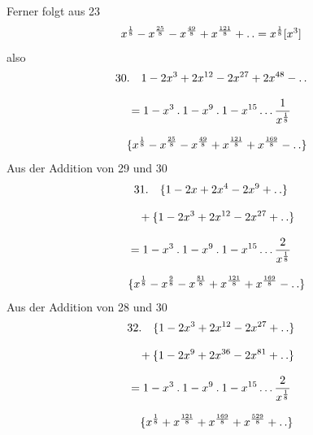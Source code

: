 Ferner folgt aus 23
\[
x^{\frac18}-x^{\frac{25}{8}}-x^{\frac{49}{8}}+x^{\frac{121}{8}}+\mathinner{.\,.}
 =x^{\frac18}[x^{3}]
\]
also
\[
\begin{gathered}
30.\quad 1-2x^{3}+2x^{12}-2x^{27}+2x^{48}-\mathinner{.\,.}\\[8pt]
 =1-x^{3}\mathbin{.}1-x^{9}\mathbin{.}1-x^{15}\mathinner{.\,.\,.}\frac{1}{x^{\frac18}}
 \\[8pt]\quad{}\{x^{\frac18}-x^{\frac{25}{8}}-x^{\frac{49}{8}}+x^{\frac{121}{8}}+x^{\frac{169}{8}}-\mathinner{.\,.}\}
\end{gathered}
\]
Aus der Addition von 29 und 30
\[
\begin{gathered}
31.\quad \{1-2x+2x^{4}-2x^{9}+\mathinner{.\,.}\}\\[8pt]\quad{}+\{1-2x^{3}+2x^{12}-2x^{27}+\mathinner{.\,.}\}\\[8pt]
 =1-x^{3}\mathbin{.}1-x^{9}\mathbin{.}1-x^{15}\mathinner{.\,.\,.}\frac{2}{x^{\frac18}}
 \\[8pt]\quad{}\{x^{\frac18}-x^{\frac98}-x^{\frac{81}{8}}+x^{\frac{121}{8}}+x^{\frac{169}{8}}-\mathinner{.\,.}\}
\end{gathered}
\]
Aus der Addition von 28 und 30
\[
\begin{gathered}
32.\quad \{1-2x^{3}+2x^{12}-2x^{27}+\mathinner{.\,.}\}\\[8pt]\quad{}+\{1-2x^{9}+2x^{36}-2x^{81}+\mathinner{.\,.}\}\\[8pt]
 =1-x^{3}\mathbin{.}1-x^{9}\mathbin{.}1-x^{15}\mathinner{.\,.\,.}\frac{2}{x^{\frac18}}
 \\[8pt]\quad{}\{x^{\frac18}+x^{\frac{121}{8}}+x^{\frac{169}{8}}+x^{\frac{529}{8}}+\mathinner{.\,.}\}
\end{gathered}
\]
\clearpage
\endgroup
